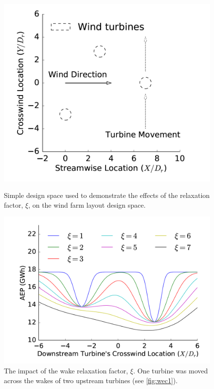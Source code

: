 	\begin{figure}
		\centering
		\begin{minipage}{.43\textwidth}
		  \centering
		  \captionsetup{width=0.85\textwidth}
		  \includegraphics[width=\textwidth]{./figures/thomas-wec1.png}
		  \caption{Simple design space used to
		  	demonstrate the effects of the relaxation
			factor, $\xi$, on the wind farm layout design space. \cite{Thomas2018}}
		  \label{fig:wec1}
		\end{minipage}%
		\begin{minipage}{.5\textwidth}
		  \centering
		  \includegraphics[width=\textwidth]{./figures/thomas-wec2.png}
		  \caption{The impact of the wake relaxation factor, $\xi$.
		  One turbine was moved across the wakes of two upstream turbines (see \cref{fig:wec1}). \cite{Thomas2018}}
		  \label{fig:wec2}
		\end{minipage}
	\end{figure}

